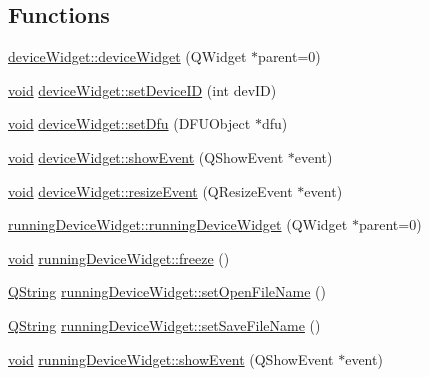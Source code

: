\subsection*{\-Functions}
\begin{DoxyCompactItemize}
\item 
\hyperlink{group___y_modem_uploader_gafcee9273f2b8216d324c235d5e164899}{device\-Widget\-::device\-Widget} (\-Q\-Widget $\ast$parent=0)
\item 
\hyperlink{group___u_a_v_objects_plugin_ga444cf2ff3f0ecbe028adce838d373f5c}{void} \hyperlink{group___y_modem_uploader_ga9b64e94e398f8362d8dcae0b9ec4275f}{device\-Widget\-::set\-Device\-I\-D} (int dev\-I\-D)
\item 
\hyperlink{group___u_a_v_objects_plugin_ga444cf2ff3f0ecbe028adce838d373f5c}{void} \hyperlink{group___y_modem_uploader_gadc475267f79d2e50ec5eac4f043aa058}{device\-Widget\-::set\-Dfu} (\-D\-F\-U\-Object $\ast$dfu)
\item 
\hyperlink{group___u_a_v_objects_plugin_ga444cf2ff3f0ecbe028adce838d373f5c}{void} \hyperlink{group___y_modem_uploader_gae8c02916851ec8e041d9e2fb1be90a91}{device\-Widget\-::show\-Event} (\-Q\-Show\-Event $\ast$event)
\item 
\hyperlink{group___u_a_v_objects_plugin_ga444cf2ff3f0ecbe028adce838d373f5c}{void} \hyperlink{group___y_modem_uploader_ga732d883048a75c6bac92c02fe90f2184}{device\-Widget\-::resize\-Event} (\-Q\-Resize\-Event $\ast$event)
\item 
\hyperlink{group___y_modem_uploader_ga768545e1c1edb88b0a2b2d87b8c02202}{running\-Device\-Widget\-::running\-Device\-Widget} (\-Q\-Widget $\ast$parent=0)
\item 
\hyperlink{group___u_a_v_objects_plugin_ga444cf2ff3f0ecbe028adce838d373f5c}{void} \hyperlink{group___y_modem_uploader_gabdf38e4bfbb45785ce938043aed76fc9}{running\-Device\-Widget\-::freeze} ()
\item 
\hyperlink{group___u_a_v_objects_plugin_gab9d252f49c333c94a72f97ce3105a32d}{\-Q\-String} \hyperlink{group___y_modem_uploader_gafa1350e74a2173b31997cb6662dc4fee}{running\-Device\-Widget\-::set\-Open\-File\-Name} ()
\item 
\hyperlink{group___u_a_v_objects_plugin_gab9d252f49c333c94a72f97ce3105a32d}{\-Q\-String} \hyperlink{group___y_modem_uploader_ga47452d9426396c22a0c0734f2c7a9f51}{running\-Device\-Widget\-::set\-Save\-File\-Name} ()
\item 
\hyperlink{group___u_a_v_objects_plugin_ga444cf2ff3f0ecbe028adce838d373f5c}{void} \hyperlink{group___y_modem_uploader_ga11be8942ae8b277f63d85dcb7c1449a4}{running\-Device\-Widget\-::show\-Event} (\-Q\-Show\-Event $\ast$event)

\end{DoxyCompactItemize}
